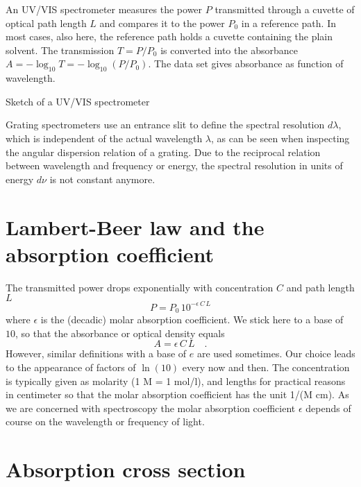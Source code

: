 An UV/VIS spectrometer measures the  power $P$ transmitted through a cuvette of optical path length $L$ and compares it to the power $P_0$ in a reference path. In most cases, also here, the reference path holds a cuvette containing  the plain solvent. The transmission $T = P / P_0$ is converted into the absorbance $A = - \log_{10} T = - \log_{10} ( P / P_0)$. The data set gives absorbance as function of wavelength.

\begin{marginfigure}
\caption{Sketch of a UV/VIS spectrometer}
\end{marginfigure}



Grating spectrometers use an entrance slit to define the spectral resolution $d \lambda$, which is independent of the actual wavelength $\lambda$, as can be seen when inspecting the   angular dispersion relation of a grating. Due to the reciprocal relation between wavelength and frequency or energy, the spectral resolution in units of energy $d \nu$ is not constant anymore.




\section{Lambert-Beer law and the absorption coefficient}

The transmitted power drops exponentially with  concentration $C$ and  path length $L$
\begin{equation}
 P = P_0 \, 10^{- \epsilon\, C \, L}
\end{equation}
where $\epsilon$ is the (decadic) molar absorption coefficient. We stick here to a base of $10$, 
so that the absorbance or optical density equals 
\begin{equation}
 A = \epsilon\, C \, L \quad.
\end{equation}
However, similar definitions with a base of $e$ are used sometimes. Our choice leads to the appearance of factors of $\ln(10)$ every now and then. The concentration is typically given as molarity (1 M = 1 mol/l), and lengths for practical reasons in centimeter
so that the molar absorption coefficient has the unit 1/(M  cm). As we are concerned with spectroscopy the molar absorption coefficient $\epsilon$ depends of course on the wavelength or frequency of light.

\section{Absorption cross section}


